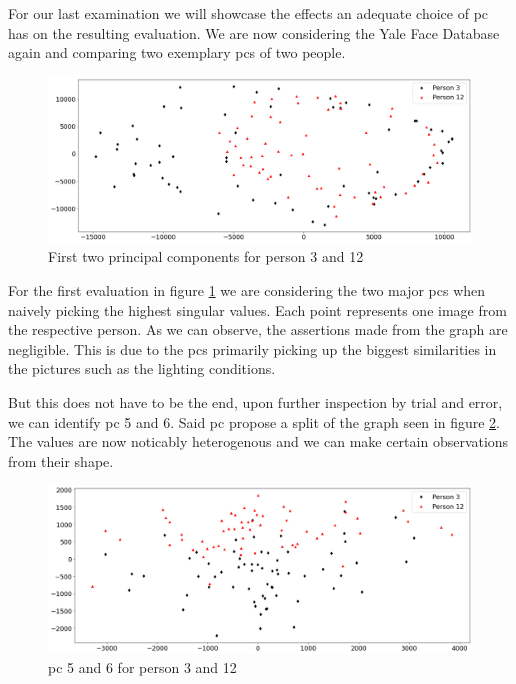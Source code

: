For our last examination we will showcase the effects an adequate choice of \acrlong{pc} has on the resulting evaluation.
We are now considering the Yale Face Database again and comparing two exemplary \glspl{pc} of two people.

\begin{center}
    \begin{figure}[h]
      \centering
      \includegraphics[width=0.9\linewidth]{external_content/media/choice_of_pc/p3_12-pc1_2-centered.png}
      \captionsetup{justification=centering}
      \caption{First two principal components for person 3 and 12}
      \label{fig:pcIandII}
    \end{figure}
\end{center}

\vspace{-8mm}
For the first evaluation in figure \ref{fig:pcIandII} we are considering the two major \glspl{pc} when naively picking the highest singular values.
Each point represents one image from the respective person.
As we can observe, the assertions made from the graph are negligible.
This is due to the \glspl{pc} primarily picking up the biggest similarities in the pictures such as the lighting conditions.

But this does not have to be the end, upon further inspection by trial and error, we can identify \gls{pc} 5 and 6.
Said \gls{pc} propose a split of the graph seen in figure \ref{fig:pcVandVI}.
The values are now noticably heterogenous and we can make certain observations from their shape.

\begin{center}
    \begin{figure}[h]
      \centering
      \includegraphics[width=0.9\linewidth]{external_content/media/choice_of_pc/p3_12-pc5_6-centered.png}
      \captionsetup{justification=centering}
      \caption{\gls{pc} 5 and 6 for person 3 and 12}
      \label{fig:pcVandVI}
    \end{figure}
\end{center}

